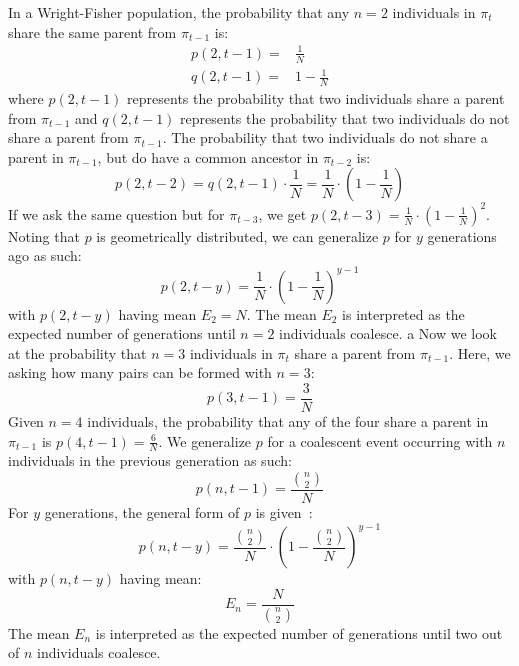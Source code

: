In a Wright-Fisher population, the probability that any $n=2$ individuals in $\pi_t$ share the same parent from
$\pi_{t-1}$ is:
\begin{equation}
    \begin{aligned}
        p(2, t-1) =& \frac{1}{N} \\
        q(2, t-1) =& 1 - \frac{1}{N}
    \end{aligned}
\end{equation}
where $p(2, t-1)$ represents the probability that two individuals share a parent from $\pi_{t-1}$ and
$q(2, t-1)$ represents the probability that two individuals do not share a parent from $\pi_{t-1}$.
The probability that two individuals do not share a parent in $\pi_{t-1}$, but do have a common ancestor
in $\pi_{t-2}$ is:
\begin{equation}
    p(2, t-2) = q(2, t-1) \cdot \frac{1}{N} = \frac{1}{N} \cdot \left(1 - \frac{1}{N}\right)
\end{equation}
If we ask the same question but for $\pi_{t-3}$, we get $p(2, t-3) = \frac{1}{N} \cdot  \left(1 - \frac{1}{N}\right)^2$.
Noting that $p$ is geometrically distributed, we can generalize $p$ for $y$ generations ago as such:
\begin{equation}
    p(2, t-y) = \frac{1}{N} \cdot \left(1 - \frac{1}{N}\right)^{y-1}
\end{equation}
with $p(2, t-y)$ having mean $E_2 = N$.
The mean $E_2$ is interpreted as the expected number of generations until $n=2$ individuals coalesce.
a
Now we look at the probability that $n=3$ individuals in $\pi_t$ share a parent from $\pi_{t-1}$.
Here, we asking how many pairs can be formed with $n=3$:
\begin{equation}
    p(3, t-1) = \frac{3}{N}
\end{equation}
Given $n=4$ individuals, the probability that any of the four share a parent in $\pi_{t-1}$ is
$p(4, t-1) = \frac{6}{N}$.
We generalize $p$ for a coalescent event occurring with $n$ individuals in the previous generation as such:
\begin{equation}
    p(n, t-1) = \frac{\binom{n}{2}}{N}
\end{equation}
For $y$ generations, the general form of $p$ is given~\cite{hudsonGeneGenealogiesCoalescent1990}:
\begin{equation}
    p(n, t-y) = \frac{\binom{n}{2}}{N} \cdot \left(1 - \frac{\binom{n}{2}}{N}\right)^{y-1}
\end{equation}
with $p(n, t-y)$ having mean:
\begin{equation}\label{eq:expectedMeanCoa}
    E_n = \frac{N}{\binom{n}{2}}
\end{equation}
The mean $E_n$ is interpreted as the expected number of generations until two out of $n$ individuals coalesce.

